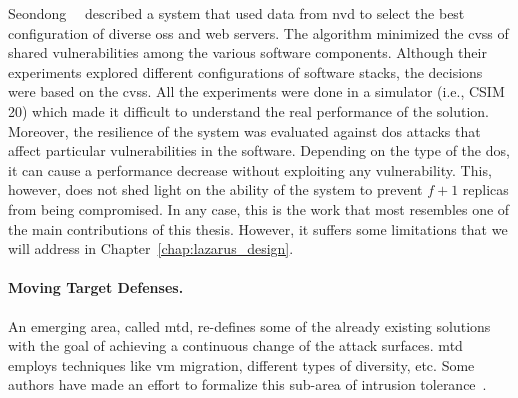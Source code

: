 Seondong~\etal{}~\cite{Seondong:2017} described a system that used data from \gls{nvd} to select the best configuration of diverse \glspl{os} and web servers.
The algorithm minimized the \gls{cvss} of shared vulnerabilities among the various software components.
Although their experiments explored different configurations of software stacks, the decisions were based on the \gls{cvss}.
All the experiments were done in a simulator (i.e., CSIM 20) which made it difficult to understand the real performance of the solution.
Moreover, the resilience of the system was evaluated against \gls{dos} attacks that affect particular vulnerabilities in the software.
Depending on the type of the \gls{dos}, it can cause a performance decrease without exploiting any vulnerability.
This, however, does not shed light on the ability of the system to prevent $f+1$ replicas from being compromised.
In any case, this is the work that most resembles one of the main contributions of this thesis. 
However, it suffers some limitations that we will address in Chapter~\ref{chap:lazarus_design}.


\paragraph{Moving Target Defenses.} 
An emerging area, called \gls{mtd}, re-defines some of the already existing solutions with the goal of achieving a continuous change of the attack surfaces. 
\gls{mtd} employs techniques like \gls{vm} migration, different types of diversity, etc.
Some authors have made an effort to formalize this sub-area of intrusion tolerance~\cite{Zhuang:2014}.

